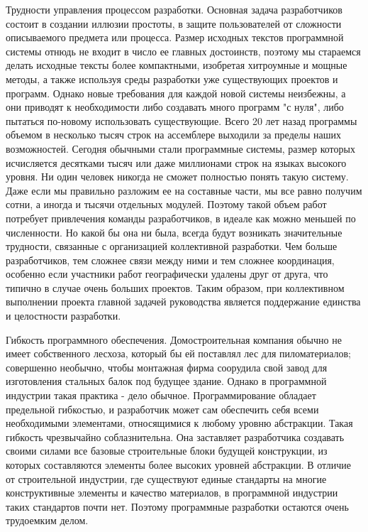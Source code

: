 \documentclass[11pt]{article}
\begin{document}
Трудности управления процессом разработки. Основная задача разработчиков состоит в создании иллюзии простоты, в защите пользователей от сложности описываемого предмета или процесса. Размер исходных текстов программной системы отнюдь не входит в число ее главных достоинств, поэтому мы стараемся делать исходные тексты более компактными, изобретая хитроумные и мощные методы, а также используя среды разработки уже существующих проектов и программ. Однако новые требования для каждой новой системы неизбежны, а они приводят к необходимости либо создавать много программ "с нуля", либо пытаться по-новому использовать существующие. Всего 20 лет назад программы объемом в несколько тысяч строк на ассемблере выходили за пределы наших возможностей. Сегодня обычными стали программные системы, размер которых исчисляется десятками тысяч или даже миллионами строк на языках высокого уровня. Ни один человек никогда не сможет полностью понять такую систему. Даже если мы правильно разложим ее на составные части, мы все равно получим сотни, а иногда и тысячи отдельных модулей. Поэтому такой объем работ потребует привлечения команды разработчиков, в идеале как можно меньшей по численности. Но какой бы она ни была, всегда будут возникать значительные трудности, связанные с организацией коллективной разработки. Чем больше разработчиков, тем сложнее связи между ними и тем сложнее координация, особенно если участники работ географически удалены друг от друга, что типично в случае очень больших проектов. Таким образом, при коллективном выполнении проекта главной задачей руководства является поддержание единства и целостности разработки.\par
Гибкость программного обеспечения. Домостроительная компания обычно не имеет собственного лесхоза, который бы ей поставлял лес для пиломатериалов; совершенно необычно, чтобы монтажная фирма соорудила свой завод для изготовления стальных балок под будущее здание. Однако в программной индустрии такая практика - дело обычное. Программирование обладает предельной гибкостью, и разработчик может сам обеспечить себя всеми необходимыми элементами, относящимися к любому уровню абстракции. Такая гибкость чрезвычайно соблазнительна. Она заставляет разработчика создавать своими силами все базовые строительные блоки будущей конструкции, из которых составляются элементы более высоких уровней абстракции. В отличие от строительной индустрии, где существуют единые стандарты на многие конструктивные элементы и качество материалов, в программной индустрии таких стандартов почти нет. Поэтому программные разработки остаются очень трудоемким делом. \par
\end{document}
